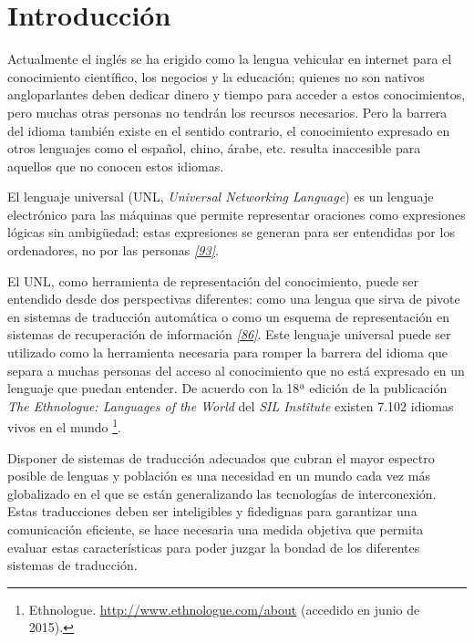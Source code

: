 \documentclass[a4paper,12pt,spanish]{book}
\begin{document}
\chapter{Introducción}
\label{0.intro:introduccion}\label{0.intro::doc}\label{0.intro:medida-de-distancia-en-grafos-unl}
Actualmente el inglés se ha erigido como la lengua vehicular en internet para el
conocimiento científico, los negocios y la educación; quienes no son nativos
angloparlantes deben dedicar dinero y tiempo para acceder a estos conocimientos,
pero muchas otras personas no tendrán los recursos necesarios. Pero la barrera del
idioma también existe en el sentido contrario, el conocimiento expresado en otros
lenguajes como el español, chino, árabe, etc. resulta inaccesible para aquellos
que no conocen estos idiomas.

El lenguaje universal (UNL, \emph{Universal Networking Language}) es un lenguaje
electrónico para las máquinas que permite representar oraciones como expresiones
lógicas sin ambigüedad; estas expresiones se generan para ser entendidas por
los ordenadores, no por las personas \label{0.intro:id1}{\hyperref[zreferences:uchida1999]{\emph{{[}93{]}}}}.

El UNL, como herramienta de representación del conocimiento, puede ser entendido
desde dos perspectivas diferentes: como una lengua que sirva de pivote en sistemas
de traducción automática o como un esquema de representación en sistemas de
recuperación de información \label{0.intro:id2}{\hyperref[zreferences:teixeiramartins2005]{\emph{{[}86{]}}}}. Este
lenguaje universal puede ser utilizado como la herramienta necesaria para romper
la barrera del idioma que separa a muchas personas del acceso al conocimiento que
no está expresado en un lenguaje que puedan entender. De acuerdo con la 18ª edición
de la publicación \emph{The Ethnologue: Languages of the World} del \emph{SIL Institute}
existen 7.102 idiomas vivos en el mundo \footnote{
Ethnologue. \href{http://www.ethnologue.com/about}{http://www.ethnologue.com/about} (accedido en junio de 2015).
}.

Disponer de sistemas de traducción adecuados que cubran el mayor espectro posible
de lenguas y población es una necesidad en un mundo cada vez más globalizado en el
que se están generalizando las tecnologías de interconexión. Estas traducciones
deben ser inteligibles y fidedignas para garantizar una comunicación eficiente, se
hace necesaria una medida objetiva que permita evaluar estas características para
poder juzgar la bondad de los diferentes sistemas de traducción.
\end{document}
